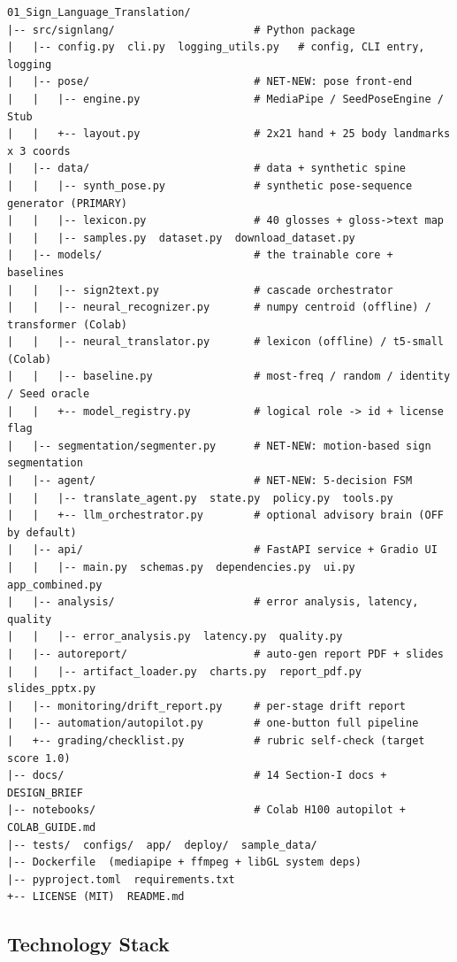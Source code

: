 \documentclass[12pt,a4paper]{article}
\begin{document}
\begin{lstlisting}[basicstyle=\ttfamily\footnotesize]
01_Sign_Language_Translation/
|-- src/signlang/                      # Python package
|   |-- config.py  cli.py  logging_utils.py   # config, CLI entry, logging
|   |-- pose/                          # NET-NEW: pose front-end
|   |   |-- engine.py                  # MediaPipe / SeedPoseEngine / Stub
|   |   +-- layout.py                  # 2x21 hand + 25 body landmarks x 3 coords
|   |-- data/                          # data + synthetic spine
|   |   |-- synth_pose.py              # synthetic pose-sequence generator (PRIMARY)
|   |   |-- lexicon.py                 # 40 glosses + gloss->text map
|   |   |-- samples.py  dataset.py  download_dataset.py
|   |-- models/                        # the trainable core + baselines
|   |   |-- sign2text.py               # cascade orchestrator
|   |   |-- neural_recognizer.py       # numpy centroid (offline) / transformer (Colab)
|   |   |-- neural_translator.py       # lexicon (offline) / t5-small (Colab)
|   |   |-- baseline.py                # most-freq / random / identity / Seed oracle
|   |   +-- model_registry.py          # logical role -> id + license flag
|   |-- segmentation/segmenter.py      # NET-NEW: motion-based sign segmentation
|   |-- agent/                         # NET-NEW: 5-decision FSM
|   |   |-- translate_agent.py  state.py  policy.py  tools.py
|   |   +-- llm_orchestrator.py        # optional advisory brain (OFF by default)
|   |-- api/                           # FastAPI service + Gradio UI
|   |   |-- main.py  schemas.py  dependencies.py  ui.py  app_combined.py
|   |-- analysis/                      # error analysis, latency, quality
|   |   |-- error_analysis.py  latency.py  quality.py
|   |-- autoreport/                    # auto-gen report PDF + slides
|   |   |-- artifact_loader.py  charts.py  report_pdf.py  slides_pptx.py
|   |-- monitoring/drift_report.py     # per-stage drift report
|   |-- automation/autopilot.py        # one-button full pipeline
|   +-- grading/checklist.py           # rubric self-check (target score 1.0)
|-- docs/                              # 14 Section-I docs + DESIGN_BRIEF
|-- notebooks/                         # Colab H100 autopilot + COLAB_GUIDE.md
|-- tests/  configs/  app/  deploy/  sample_data/
|-- Dockerfile  (mediapipe + ffmpeg + libGL system deps)
|-- pyproject.toml  requirements.txt
+-- LICENSE (MIT)  README.md
\end{lstlisting}

\subsection{Technology Stack}
\end{document}
